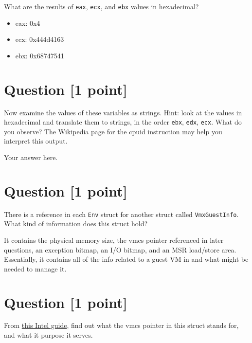 \documentclass[11pt]{article}
\begin{document}
What are the results of \texttt{eax}, \texttt{ecx}, and \texttt{ebx} values in hexadecimal?

\begin{solution}
    \begin{itemize}
        \item eax: 0x4
        \item ecx: 0x444d4163
        \item ebx: 0x68747541
    \end{itemize}
\end{solution}


\section{Question [1 point]}

Now examine the values of these variables as strings. 
Hint: look at the values in hexadecimal and translate them to strings, 
in the order \texttt{ebx}, \texttt{edx}, \texttt{ecx}. What do you observe? 
The \href{https://en.wikipedia.org/wiki/CPUID}{Wikipedia page} for the cpuid instruction 
may help you interpret this output.

\begin{solution}
Your answer here.
\end{solution}


\section{Question [1 point]}

There is a reference in each \texttt{Env} struct for another struct called 
\texttt{VmxGuestInfo}. What kind of information does this struct hold?

\begin{solution}
It contains the physical memory size, the vmcs pointer referenced in later questions, an exception bitmap, an 
I/O bitmap, and an MSR load/store area. Essentially, it contains all of the info related to a guest VM in 
and what might be needed to manage it. 
\end{solution}


\section{Question [1 point]}

From \href{https://www.cs.utexas.edu/~vijay/cs378-f17/projects/64-ia-32-architectures-software-developer-vol-3c-part-3-manual.pdf}{this Intel guide}, 
find out what the vmcs pointer in this struct stands for, and what it purpose it serves.
\end{document}
